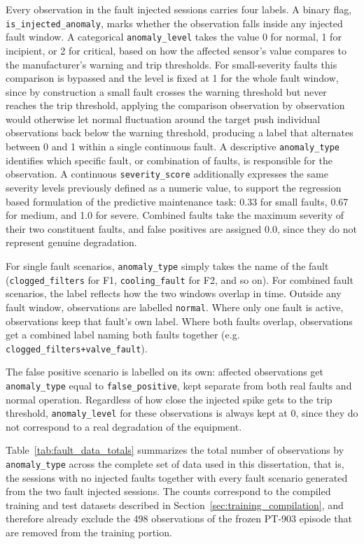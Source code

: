 Every observation in the fault injected sessions carries four labels. A binary flag,
\texttt{is\_injected\_anomaly}, marks whether the observation falls inside any injected fault window. A
categorical \texttt{anomaly\_level} takes the value 0 for normal, 1 for incipient, or 2 for critical, based
on how the affected sensor's value compares to the manufacturer's warning and trip thresholds. For
small-severity faults this comparison is bypassed and the level is fixed at 1 for the whole fault window,
since by construction a small fault crosses the warning threshold but never reaches the trip threshold, 
applying the comparison observation by observation would otherwise
let normal fluctuation around the target push individual observations back below the warning threshold,
producing a label that alternates between 0 and 1 within a single continuous fault. A descriptive
\texttt{anomaly\_type} identifies which specific fault, or combination of faults, is responsible for the
observation. A continuous \texttt{severity\_score} additionally expresses the same severity levels
previously defined as a numeric value, to support the regression based formulation of the predictive
maintenance task: 0.33 for small faults, 0.67 for medium, and 1.0 for severe. Combined faults take the
maximum severity of their two constituent faults, and false positives are assigned 0.0, since they do not
represent genuine degradation.

For single fault scenarios, \texttt{anomaly\_type} simply takes the name of the fault 
(\texttt{clogged\_filters} for F1, \texttt{cooling\_fault} for F2, and so on). For combined fault 
scenarios, the label reflects how the two windows overlap in time. Outside any fault window, observations 
are labelled \texttt{normal}. Where only one fault is active, observations keep that fault's own label. 
Where both faults overlap, observations get a combined label naming both faults together (e.g. 
\texttt{clogged\_filters+valve\_fault}).

The false positive scenario is labelled on its own: affected observations get \texttt{anomaly\_type} equal 
to \texttt{false\_positive}, kept separate from both real faults and normal operation. Regardless of how 
close the injected spike gets to the trip threshold, \texttt{anomaly\_level} for these observations is 
always kept at 0, since they do not correspond to a real degradation of the equipment.

Table~\ref{tab:fault_data_totals} summarizes the total number of observations by \texttt{anomaly\_type} 
across the complete set of data used in this dissertation, that is, the sessions with no injected faults 
together with every fault scenario generated from the two fault injected sessions. The counts correspond 
to the compiled training and test datasets described in Section~\ref{sec:training_compilation}, and 
therefore already exclude the 498 observations of the frozen PT-903 episode that are removed from the 
training portion.

